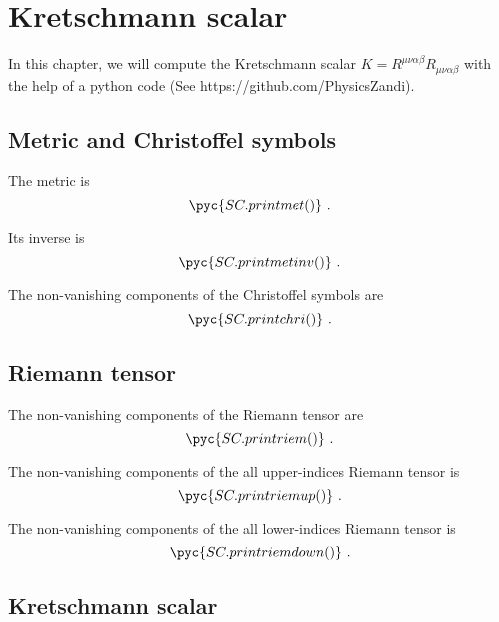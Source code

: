 \appendix

\chapter{Kretschmann scalar}

    In this chapter, we will compute the Kretschmann scalar $K = R^{\mu\nu\alpha\beta} R_{\mu\nu\alpha\beta}$ with the help of a python code (See https://github.com/PhysicsZandi).

\section{Metric and Christoffel symbols}

    The metric is 
    \begin{equation*}
        \pyc{SC.printmet()} ~.
    \end{equation*}

    Its inverse is 
    \begin{equation*}
        \pyc{SC.printmetinv()} ~.
    \end{equation*}

    The non-vanishing components of the Christoffel symbols are
    \begin{equation*}
        \pyc{SC.printchri()} ~.
    \end{equation*}

\section{Riemann tensor}

    The non-vanishing components of the Riemann tensor are
    \begin{equation*}
        \pyc{SC.printriem()} ~.
    \end{equation*}

    The non-vanishing components of the all upper-indices Riemann tensor is 
    \begin{equation*}
        \pyc{SC.printriemup()} ~.
    \end{equation*}

    The non-vanishing components of the all lower-indices Riemann tensor is
    \begin{equation*}
        \pyc{SC.printriemdown()} ~.
    \end{equation*}

\section{Kretschmann scalar}
    
